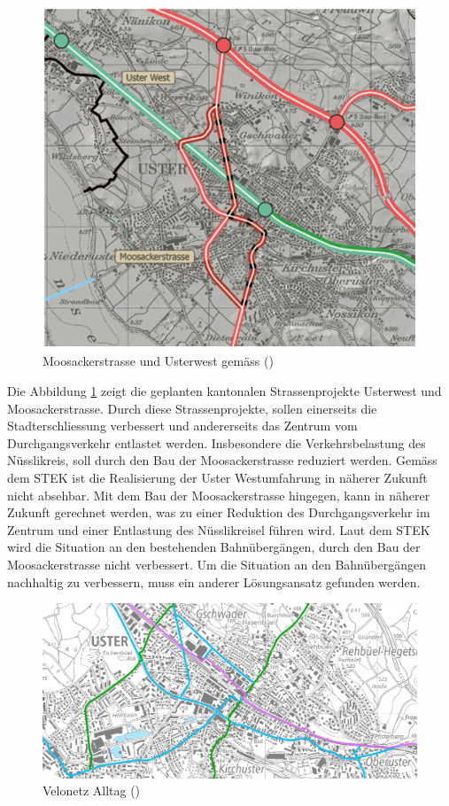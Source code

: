 \begin{figure}[h!]
	\centering
	\includegraphics[width=\textwidth]{figures/04-04-UsterWest-Moosackerstr}
	\caption[Strassenprojekte im Kantonalen Richtplan]{Moosackerstrasse und Usterwest gemäss (\cite{STEK})}
	\label{img:Strassenprojekte}
\end{figure}

Die Abbildung \ref{img:Strassenprojekte} zeigt die geplanten kantonalen Strassenprojekte Usterwest und Moosackerstrasse. Durch diese Strassenprojekte, sollen einerseits die Stadterschliessung verbessert und andererseits das Zentrum vom Durchgangsverkehr entlastet werden. Insbesondere die Verkehrsbelastung des Nüsslikreis, soll durch den Bau der Moosackerstrasse reduziert werden. Gemäss dem STEK ist die Realisierung der Uster Westumfahrung in näherer Zukunft nicht absehbar. Mit dem Bau der Moosackerstrasse hingegen, kann in näherer Zukunft gerechnet werden, was zu einer Reduktion des Durchgangsverkehr im Zentrum und einer Entlastung des Nüsslikreisel führen wird. Laut dem STEK wird die Situation an den bestehenden Bahnübergängen, durch den Bau der Moosackerstrasse nicht verbessert. Um die Situation an den Bahnübergängen nachhaltig zu verbessern, muss ein anderer Lösungsansatz gefunden werden. 

\begin{figure}[h!]
	\centering
	\includegraphics[width=\textwidth]{figures/04-01-Veloweg-Alltag}
	\caption[Velonetz Alltag]{Velonetz Alltag (\cite{GIS})}
	\label{img:Velonetz}
\end{figure}
 
